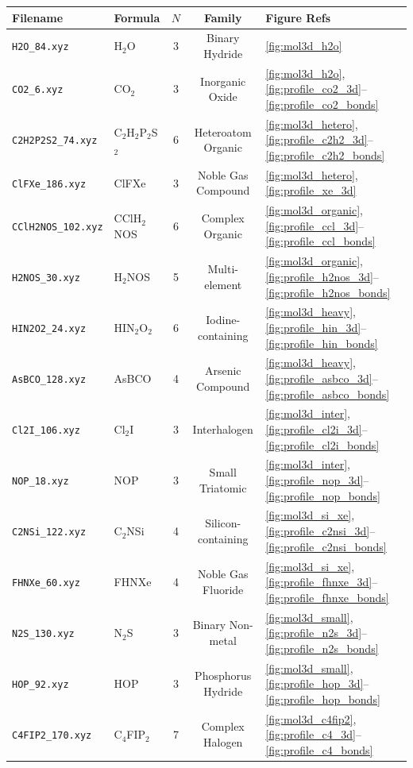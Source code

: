 \documentclass[11pt,a4paper]{article}
\begin{document}
\begin{center}
\small
\begin{tabular}{llccl}
\toprule
\textbf{Filename} & \textbf{Formula} & \textbf{$N$} & \textbf{Family} & \textbf{Figure Refs} \\
\midrule
\texttt{H2O\_84.xyz}          & H$_2$O           & 3 & Binary Hydride    & \ref{fig:mol3d_h2o} \\
\texttt{CO2\_6.xyz}           & CO$_2$           & 3 & Inorganic Oxide   & \ref{fig:mol3d_h2o}, \ref{fig:profile_co2_3d}--\ref{fig:profile_co2_bonds} \\
\texttt{C2H2P2S2\_74.xyz}     & C$_2$H$_2$P$_2$S$_2$ & 6 & Heteroatom Organic & \ref{fig:mol3d_hetero}, \ref{fig:profile_c2h2_3d}--\ref{fig:profile_c2h2_bonds} \\
\texttt{ClFXe\_186.xyz}       & ClFXe            & 3 & Noble Gas Compound & \ref{fig:mol3d_hetero}, \ref{fig:profile_xe_3d} \\
\texttt{CClH2NOS\_102.xyz}    & CClH$_2$NOS      & 6 & Complex Organic   & \ref{fig:mol3d_organic}, \ref{fig:profile_ccl_3d}--\ref{fig:profile_ccl_bonds} \\
\texttt{H2NOS\_30.xyz}        & H$_2$NOS         & 5 & Multi-element     & \ref{fig:mol3d_organic}, \ref{fig:profile_h2nos_3d}--\ref{fig:profile_h2nos_bonds} \\
\texttt{HIN2O2\_24.xyz}       & HIN$_2$O$_2$     & 6 & Iodine-containing & \ref{fig:mol3d_heavy}, \ref{fig:profile_hin_3d}--\ref{fig:profile_hin_bonds} \\
\texttt{AsBCO\_128.xyz}       & AsBCO            & 4 & Arsenic Compound  & \ref{fig:mol3d_heavy}, \ref{fig:profile_asbco_3d}--\ref{fig:profile_asbco_bonds} \\
\texttt{Cl2I\_106.xyz}        & Cl$_2$I          & 3 & Interhalogen      & \ref{fig:mol3d_inter}, \ref{fig:profile_cl2i_3d}--\ref{fig:profile_cl2i_bonds} \\
\texttt{NOP\_18.xyz}          & NOP              & 3 & Small Triatomic   & \ref{fig:mol3d_inter}, \ref{fig:profile_nop_3d}--\ref{fig:profile_nop_bonds} \\
\texttt{C2NSi\_122.xyz}       & C$_2$NSi         & 4 & Silicon-containing & \ref{fig:mol3d_si_xe}, \ref{fig:profile_c2nsi_3d}--\ref{fig:profile_c2nsi_bonds} \\
\texttt{FHNXe\_60.xyz}        & FHNXe            & 4 & Noble Gas Fluoride & \ref{fig:mol3d_si_xe}, \ref{fig:profile_fhnxe_3d}--\ref{fig:profile_fhnxe_bonds} \\
\texttt{N2S\_130.xyz}         & N$_2$S           & 3 & Binary Non-metal  & \ref{fig:mol3d_small}, \ref{fig:profile_n2s_3d}--\ref{fig:profile_n2s_bonds} \\
\texttt{HOP\_92.xyz}          & HOP              & 3 & Phosphorus Hydride & \ref{fig:mol3d_small}, \ref{fig:profile_hop_3d}--\ref{fig:profile_hop_bonds} \\
\texttt{C4FIP2\_170.xyz}      & C$_4$FIP$_2$     & 7 & Complex Halogen   & \ref{fig:mol3d_c4fip2}, \ref{fig:profile_c4_3d}--\ref{fig:profile_c4_bonds} \\
\bottomrule
\end{tabular}
\end{center}
\end{document}
